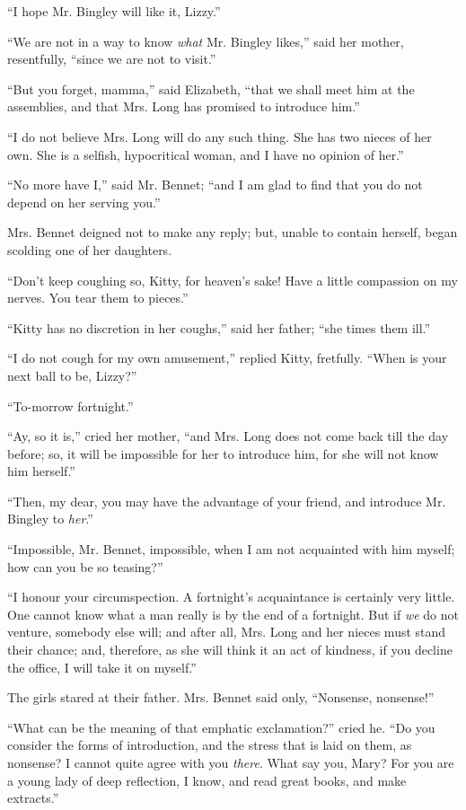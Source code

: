 \documentclass[12pt,openright]{book}
\begin{document}
“I hope Mr. Bingley will like it, Lizzy.”

“We are not in a way to know \textit{what} Mr. Bingley likes,” said her mother, resentfully, “since we are not to visit.”

“But you forget, mamma,” said Elizabeth, “that we shall meet him at the assemblies, and that Mrs. Long has promised to introduce him.”

“I do not believe Mrs. Long will do any such thing. She has two nieces of her own. She is a selfish, hypocritical woman, and I have no opinion of her.”

“No more have I,” said Mr. Bennet; “and I am glad to find that you do not depend on her serving you.”

Mrs. Bennet deigned not to make any reply; but, unable to contain herself, began scolding one of her daughters.

“Don’t keep coughing so, Kitty, for heaven’s sake! Have a little compassion on my nerves. You tear them to pieces.”

“Kitty has no discretion in her coughs,” said her father; “she times them ill.”

“I do not cough for my own amusement,” replied Kitty, fretfully. “When is your next ball to be, Lizzy?”

“To-morrow fortnight.”

“Ay, so it is,” cried her mother, “and Mrs. Long does not come back till the day before; so, it will be impossible for her to introduce him, for she will not know him herself.”

“Then, my dear, you may have the advantage of your friend, and introduce Mr. Bingley to \textit{her}.”

“Impossible, Mr. Bennet, impossible, when I am not acquainted with him myself; how can you be so teasing?”

“I honour your circumspection. A fortnight’s acquaintance is certainly very little. One cannot know what a man really is by the end of a fortnight. But if \textit{we} do not venture, somebody else will; and after all, Mrs. Long and her nieces must stand their chance; and, therefore, as she will think it an act of kindness, if you decline the office, I will take it on myself.”

The girls stared at their father. Mrs. Bennet said only, “Nonsense, nonsense!”

“What can be the meaning of that emphatic exclamation?” cried he. “Do you consider the forms of introduction, and the stress that is laid on them, as nonsense? I cannot quite agree with you \textit{there}. What say you, Mary? For you are a young lady of deep reflection, I know, and read great books, and make extracts.”
\end{document}
